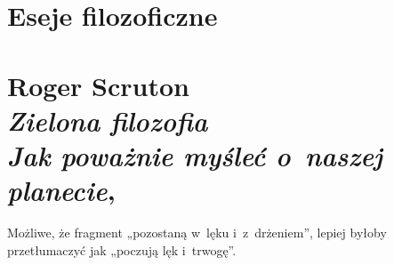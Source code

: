 \documentclass[a4paper,11pt]{article}
\numberwithin{equation}{section}
\begin{document}
\VerSpaceTwo









\section{Eseje filozoficzne}



\section{ %
  Roger Scruton \\
  \textit{Zielona filozofia} \\
  \textit{Jak poważnie myśleć o~naszej planecie},
  \cite{ChodakiewiczOCywilizacjiSmierci2019}}




\noindent
{} Możliwe, że fragment „pozostaną w~lęku
i~z~drżeniem”, lepiej byłoby przetłumaczyć jak „poczują lęk
i~trwogę”.

\VerSpaceFour





\end{document}
